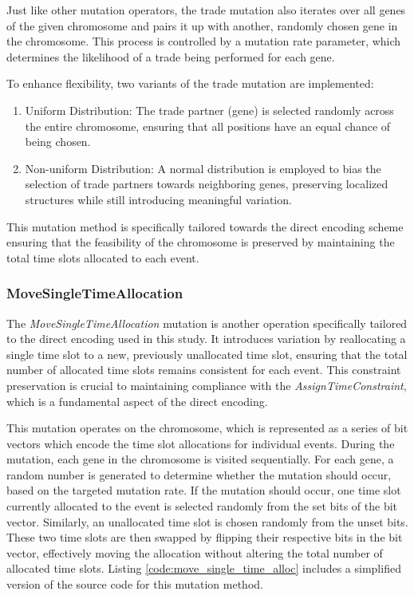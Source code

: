 \documentclass[english,examples]{isasthesis}
\begin{document}
Just like other mutation operators, the trade mutation also iterates over
all genes of the given chromosome and pairs it up with another, randomly chosen
gene in the chromosome. This process is controlled by a mutation rate parameter,
which determines the likelihood of a trade being performed for each gene.

To enhance flexibility, two variants of the trade mutation are implemented:
\begin{enumerate}
    \item   Uniform Distribution: The trade partner (gene) is selected randomly
            across the entire chromosome, ensuring that all positions have an
            equal chance of being chosen.
    \item   Non-uniform Distribution: A normal distribution is employed to bias
            the selection of trade partners towards neighboring genes,
            preserving localized structures while still introducing meaningful
            variation.
\end{enumerate}

This mutation method is specifically tailored towards the direct encoding scheme
ensuring that the feasibility of the chromosome is preserved by maintaining the
total time slots allocated to each event.

\subsubsection{MoveSingleTimeAllocation}
\label{MoveSingleTimeAllocation}
The \textit{MoveSingleTimeAllocation} mutation is another operation
specifically tailored to the direct encoding used in this study. It introduces
variation by reallocating a single time slot to a new, previously unallocated
time slot, ensuring that the total number of allocated time slots remains
consistent for each event. This constraint preservation is crucial to
maintaining compliance with the \textit{AssignTimeConstraint}, which is a
fundamental aspect of the direct encoding.

This mutation operates on the chromosome, which is represented as a series of
bit vectors which encode the time slot allocations for individual events.
During the mutation, each gene in the chromosome is visited sequentially.
For each gene, a random number is generated to determine whether the mutation
should occur, based on the targeted mutation rate. If the mutation should
occur, one time slot currently allocated to the event is selected randomly
from the set bits of the bit vector. Similarly, an unallocated time slot is
chosen randomly from the unset bits. These two time slots are then swapped
by flipping their respective bits in the bit vector, effectively moving the
allocation without altering the total number of allocated time slots.
Listing \ref{code:move_single_time_alloc} includes a simplified version of
the source code for this mutation method.
\end{document}
